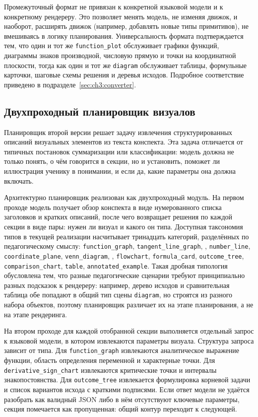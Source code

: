Промежуточный формат не привязан к конкретной языковой модели и к конкретному рендереру. Это позволяет менять модель, не изменяя движок, и наоборот, расширять движок (например, добавлять новые типы примитивов), не вмешиваясь в логику планирования. Универсальность формата подтверждается тем, что один и тот же \texttt{function\_plot} обслуживает графики функций, диаграммы знаков производной, числовую прямую и точки на координатной плоскости, тогда как один и тот же \texttt{diagram} обслуживает таблицы, формульные карточки, шаговые схемы решения и деревья исходов. Подробное соответствие приведено в подразделе~\ref{sec:ch3:converter}.

\subsection{Двухпроходный планировщик визуалов}
\label{sec:ch3:planner}

Планировщик второй версии решает задачу извлечения структурированных описаний визуальных элементов из текста конспекта. Эта задача отличается от типичных постановок суммаризации или классификации: модель должна не только понять, о чём говорится в секции, но и установить, поможет ли иллюстрация ученику в понимании, и если да, какие параметры она должна включать.

Архитектурно планировщик реализован как двухпроходный модуль. На первом проходе модель получает обзор конспекта в виде нумерованного списка заголовков и кратких описаний, после чего возвращает решения по каждой секции в виде пары: нужен ли визуал и какого он типа. Доступная таксономия типов в текущей реализации насчитывает тринадцать категорий, разделённых по педагогическому смыслу: \texttt{function\_graph}, \texttt{tangent\_line\_graph}, , \texttt{number\_line}, \texttt{coordinate\_plane}, \texttt{venn\_diagram}, , \texttt{flowchart}, \texttt{formula\_card}, \texttt{outcome\_tree}, \texttt{comparison\_chart}, \texttt{table}, \texttt{annotated\_example}. Такая дробная типология обусловлена тем, что разные педагогические сценарии требуют принципиально разных подсказок к рендереру: например, дерево исходов и сравнительная таблица обе попадают в общий тип сцены \texttt{diagram}, но строятся из разного набора объектов, поэтому планировщик различает их на этапе планирования, а не на этапе рендеринга.

На втором проходе для каждой отобранной секции выполняется отдельный запрос к языковой модели, в котором извлекаются параметры визуала. Структура запроса зависит от типа. Для \texttt{function\_graph} извлекаются аналитическое выражение функции, область определения переменной и характерные точки. Для \texttt{derivative\_sign\_chart} извлекаются критические точки и интервалы знакопостоянства. Для \texttt{outcome\_tree} извлекается формулировка корневой задачи и список вариантов исхода с краткими подписями. Если ответ модели не удаётся разобрать как валидный JSON либо в нём отсутствуют ключевые параметры, секция помечается как пропущенная: общий контур переходит к следующей.

